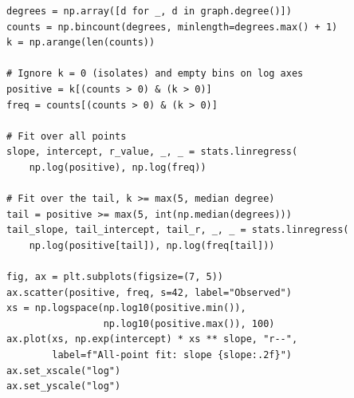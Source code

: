 \begin{lstlisting}[style=python]
degrees = np.array([d for _, d in graph.degree()])
counts = np.bincount(degrees, minlength=degrees.max() + 1)
k = np.arange(len(counts))

# Ignore k = 0 (isolates) and empty bins on log axes
positive = k[(counts > 0) & (k > 0)]
freq = counts[(counts > 0) & (k > 0)]

# Fit over all points
slope, intercept, r_value, _, _ = stats.linregress(
    np.log(positive), np.log(freq))

# Fit over the tail, k >= max(5, median degree)
tail = positive >= max(5, int(np.median(degrees)))
tail_slope, tail_intercept, tail_r, _, _ = stats.linregress(
    np.log(positive[tail]), np.log(freq[tail]))

fig, ax = plt.subplots(figsize=(7, 5))
ax.scatter(positive, freq, s=42, label="Observed")
xs = np.logspace(np.log10(positive.min()),
                 np.log10(positive.max()), 100)
ax.plot(xs, np.exp(intercept) * xs ** slope, "r--",
        label=f"All-point fit: slope {slope:.2f}")
ax.set_xscale("log")
ax.set_yscale("log")
\end{lstlisting}

